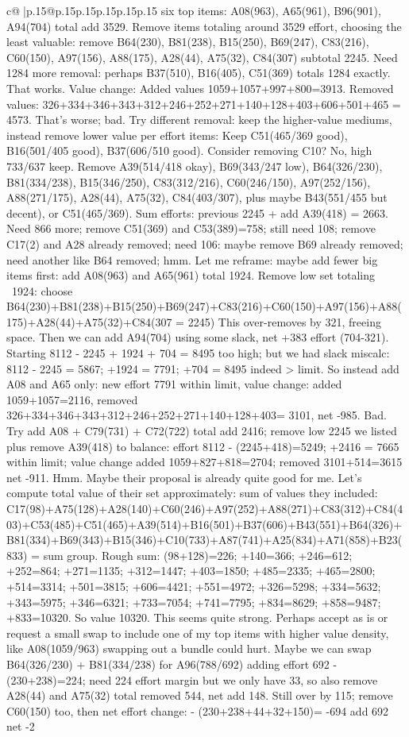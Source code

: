 \documentclass{article}
\begin{document}
{\begin{supertabular}{c@{$\;$}|p{.15\linewidth}@{}p{.15\linewidth}p{.15\linewidth}p{.15\linewidth}p{.15\linewidth}p{.15\linewidth}}
{{{six top items: A08(963), A65(961), B96(901), A94(704) total add 3529. Remove items totaling around 3529 effort, choosing the least valuable: remove B64(230), B81(238), B15(250), B69(247), C83(216), C60(150), A97(156), A88(175), A28(44), A75(32), C84(307) subtotal 2245. Need 1284 more removal: perhaps B37(510), B16(405), C51(369) totals 1284 exactly. That works. Value change: Added values 1059+1057+997+800=3913. Removed values: 326+334+346+343+312+246+252+271+140+128+403+606+501+465 = 4573. That’s worse; bad. Try different removal: keep the higher-value mediums, instead remove lower value per effort items: Keep C51(465/369 good), B16(501/405 good), B37(606/510 good). Consider removing C10? No, high 733/637 keep. Remove A39(514/418 okay), B69(343/247 low), B64(326/230), B81(334/238), B15(346/250), C83(312/216), C60(246/150), A97(252/156), A88(271/175), A28(44), A75(32), C84(403/307), plus maybe B43(551/455 but decent), or C51(465/369). Sum efforts: previous 2245 + add A39(418) = 2663. Need 866 more; remove C51(369) and C53(389)=758; still need 108; remove C17(2) and A28 already removed; need 106: maybe remove B69 already removed; need another like B64 removed; hmm. Let me reframe: maybe add fewer big items first: add A08(963) and A65(961) total 1924. Remove low set totaling ~1924: choose B64(230)+B81(238)+B15(250)+B69(247)+C83(216)+C60(150)+A97(156)+A88(175)+A28(44)+A75(32)+C84(307 = 2245) This over-removes by 321, freeing space. Then we can add A94(704) using some slack, net +383 effort (704-321). Starting 8112 - 2245 + 1924 + 704 = 8495 too high; but we had slack miscalc: 8112 - 2245 = 5867; +1924 = 7791; +704 = 8495 indeed > limit. So instead add A08 and A65 only: new effort 7791 within limit, value change: added 1059+1057=2116, removed 326+334+346+343+312+246+252+271+140+128+403= 3101, net -985. Bad. Try add A08 + C79(731) + C72(722) total add 2416; remove low 2245 we listed plus remove A39(418) to balance: effort 8112 - (2245+418)=5249; +2416 = 7665 within limit; value change added 1059+827+818=2704; removed 3101+514=3615 net -911. Hmm. Maybe their proposal is already quite good for me. Let’s compute total value of their set approximately: sum of values they included: C17(98)+A75(128)+A28(140)+C60(246)+A97(252)+A88(271)+C83(312)+C84(403)+C53(485)+C51(465)+A39(514)+B16(501)+B37(606)+B43(551)+B64(326)+B81(334)+B69(343)+B15(346)+C10(733)+A87(741)+A25(834)+A71(858)+B23(833) = sum group. Rough sum: (98+128)=226; +140=366; +246=612; +252=864; +271=1135; +312=1447; +403=1850; +485=2335; +465=2800; +514=3314; +501=3815; +606=4421; +551=4972; +326=5298; +334=5632; +343=5975; +346=6321; +733=7054; +741=7795; +834=8629; +858=9487; +833=10320. So value 10320. This seems quite strong. Perhaps accept as is or request a small swap to include one of my top items with higher value density, like A08(1059/963) swapping out a bundle could hurt. Maybe we can swap B64(326/230) + B81(334/238) for A96(788/692) adding effort 692 - (230+238)=224; need 224 effort margin but we only have 33, so also remove A28(44) and A75(32) total removed 544, net add 148. Still over by 115; remove C60(150) too, then net effort change: - (230+238+44+32+150)= -694 add 692 net -2 }}}
\end{supertabular}}
\end{document}

